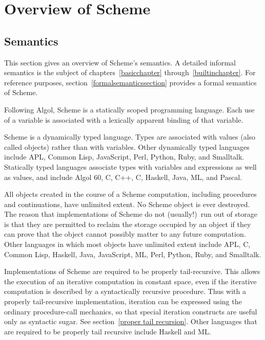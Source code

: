 
\chapter{Overview of Scheme}

\section{Semantics}
\label{semanticsection}

This section gives an overview of Scheme's semantics.  A
detailed informal semantics is the subject of
chapters~\ref{basicchapter} through~\ref{builtinchapter}.  For reference
purposes, section~\ref{formalsemanticssection} provides a formal
semantics of Scheme.

\vest Following Algol, Scheme is a statically scoped programming
language.  Each use of a variable is associated with a lexically
apparent binding of that variable.

\vest Scheme is a dynamically typed language.  Types
are associated with values (also called objects) rather than
with variables.  Other dynamically typed languages include
APL, Common Lisp, JavaScript, Perl, Python, Ruby, and Smalltalk.
Statically typed languages associate types with variables and expressions
as well as values, and include
Algol 60, C, C++, C\sharpsign, Haskell, Java, ML, and Pascal.

\vest All objects created in the course of a Scheme computation, including
procedures and continuations, have unlimited extent.
No Scheme object is ever destroyed.  The reason that
implementations of Scheme do not (usually!)\ run out of storage is that
they are permitted to reclaim the storage occupied by an object if
they can prove that the object cannot possibly matter to any future
computation.  Other languages in which most objects have unlimited
extent include 
APL, C\sharpsign, Common Lisp, Haskell, Java, JavaScript, ML, Perl,
Python, Ruby, and Smalltalk.

\vest Implementations of Scheme are required to be properly tail-recursive.
This allows the execution of an iterative computation in constant space,
even if the iterative computation is described by a syntactically
recursive procedure.  Thus with a properly tail-recursive implementation,
iteration can be expressed using the ordinary procedure-call
mechanics, so that special iteration constructs are useful only as
syntactic sugar.  See section~\ref{proper tail recursion}.
Other languages that are required to be properly tail recursive
include Haskell and ML.

